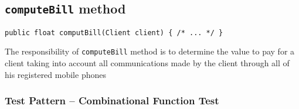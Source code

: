 %
%
%
\subsection{\texttt{computeBill} method}
\label{sec:methods.computeBill}
\begin{verbatim}
public float computBill(Client client) { /* ... */ }
\end{verbatim}

The responsibility of \texttt{computeBill} method is to determine the value to
pay for a client taking into account all communications made by the client
through all of his registered mobile phones

\subsubsection{Test Pattern -- Combinational Function Test}
\label{sec:methods.computeBill.pattern}

